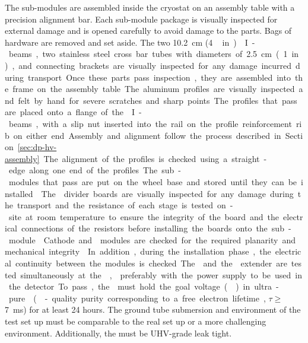The  sub-modules are assembled inside the cryostat on an assembly table with a precision alignment bar. %
Each sub-module package is visually inspected for external damage and is opened carefully to avoid damage to the  parts.  
Bags of hardware are removed and set aside. 
The two \SI{10.2}{\cm} (\SI{4}\,in)  I-beams, two stainless steel cross bar tubes with diameters of \SI{2.5}{cm} (\SI{1}{in}), and connecting brackets are visually inspected for any damage incurred during transport. Once these parts pass inspection, they are assembled into the frame on the assembly table.  
The aluminum profiles are visually inspected and felt by hand for severe scratches and sharp points.  The profiles that pass are placed onto a flange of the  I-beams, with %
a slip nut inserted into the rail on the profile reinforcement rib on either end. 
Assembly and alignment follow the process described in Section~\ref{sec:dp-hv-assembly}. The alignment of the profiles is checked using a straight-edge along one end of the profiles.  The sub-modules that pass are put on the wheel base and stored until they can be installed. 

The  divider boards are visually inspected for any damage during the transport and the resistance of each stage is tested on-site at room temperature to ensure the integrity of the board and the electrical connections of the resistors before installing the boards onto the sub-module. 

Cathode and  modules are checked for the required planarity and mechanical integrity. 
In addition, during the installation phase, the electrical continuity between the modules is checked.

The \fdth and the  extender are tested simultaneously  at the ,  preferably with the power supply to be used in the detector. 
To pass, the \fdth must hold the goal voltage (\dptargetdriftvoltneg{}) in ultra-pure \lar (-quality purity corresponding to a free electron lifetime, $\tau\geq$\SI{7}{\ms}) for at least \num{24} hours. The ground tube submersion and \efield environment of the test set up must be comparable to the real  set up or a more challenging environment. Additionally, the \fdth must be UHV-grade leak tight.

